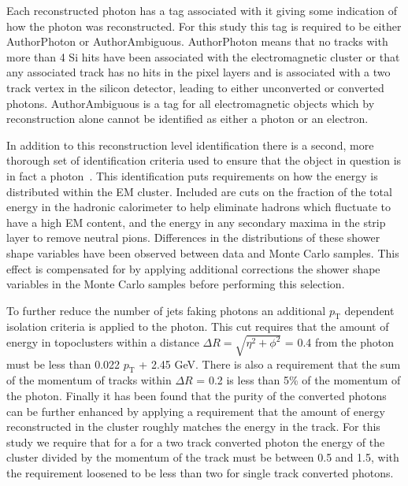 Each reconstructed photon has a tag associated with it giving some indication of how the photon was reconstructed.  
For this study this tag is required to be either AuthorPhoton or AuthorAmbiguous.  
AuthorPhoton means that no tracks with more than 4 Si hits have been associated with the electromagnetic cluster or that any associated track has no hits in the pixel layers and is associated with a two track vertex in the silicon detector, leading to either unconverted or converted photons.  
AuthorAmbiguous is a tag for all electromagnetic objects which by reconstruction alone cannot be identified as either a photon or an electron.  

In addition to this reconstruction level identification there is a second, more thorough set of identification criteria used to ensure that the object in question is in fact a photon~\cite{ATL-PHYS-PUB-2016-014}.  
This identification puts requirements on how the energy is distributed within the EM cluster.  
Included are cuts on the fraction of the total energy in the hadronic calorimeter to help eliminate hadrons which fluctuate to have a high EM content, and the energy in any secondary maxima in the strip layer to remove neutral pions.  
Differences in the distributions of these shower shape variables have been observed between data and Monte Carlo samples.  
This effect is compensated for by applying additional corrections the shower shape variables in the Monte Carlo samples before performing this selection.  

To further reduce the number of jets faking photons an additional $p_{\mathrm{T}}$ dependent isolation criteria is applied to the photon.  
This cut requires that the amount of energy in topoclusters within a distance $\Delta R=\sqrt{\eta^2+\phi^2}$ = 0.4 from the photon must be less than 0.022 $p_{\mathrm{T}}$ + 2.45 GeV.  
There is also a requirement that the sum of the momentum of tracks within $\Delta R$ = 0.2 is less than 5\% of the momentum of the photon.  
Finally it has been found that the purity of the converted photons can be further enhanced by applying a requirement that the amount of energy reconstructed in the cluster roughly matches the energy in the track.  
For this study we require that for a for a two track converted photon the energy of the cluster divided by the momentum of the track must be between 0.5 and 1.5, with the requirement loosened to be less than two for single track converted photons.  


